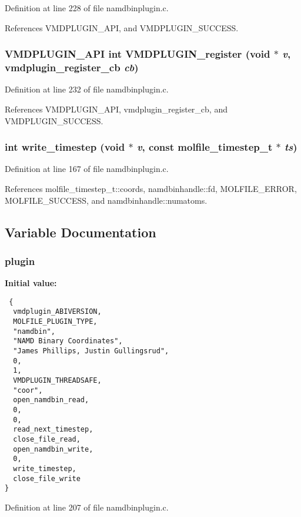Definition at line 228 of file namdbinplugin.c.

References VMDPLUGIN\_\-API, and VMDPLUGIN\_\-SUCCESS.
\subsubsection{\setlength{\rightskip}{0pt plus 5cm}VMDPLUGIN\_\-API int VMDPLUGIN\_\-register (void $\ast$ {\em v}, {\bf vmdplugin\_\-register\_\-cb} {\em cb})}\label{namdbinplugin_8c_a8}




Definition at line 232 of file namdbinplugin.c.

References VMDPLUGIN\_\-API, vmdplugin\_\-register\_\-cb, and VMDPLUGIN\_\-SUCCESS.
\subsubsection{\setlength{\rightskip}{0pt plus 5cm}int write\_\-timestep (void $\ast$ {\em v}, const {\bf molfile\_\-timestep\_\-t} $\ast$ {\em ts})\hspace{0.3cm}{\tt  [static]}}\label{namdbinplugin_8c_a5}




Definition at line 167 of file namdbinplugin.c.

References molfile\_\-timestep\_\-t::coords, namdbinhandle::fd, MOLFILE\_\-ERROR, MOLFILE\_\-SUCCESS, and namdbinhandle::numatoms.

\subsection{Variable Documentation}
\subsubsection{ plugin\hspace{0.3cm}{\tt  [static]}}\label{namdbinplugin_8c_a0}


{\bf Initial value:}

\footnotesize\begin{verbatim} {
  vmdplugin_ABIVERSION,         
  MOLFILE_PLUGIN_TYPE,          
  "namdbin",                    
  "NAMD Binary Coordinates",    
  "James Phillips, Justin Gullingsrud",  
  0,                            
  1,                            
  VMDPLUGIN_THREADSAFE,         
  "coor",                       
  open_namdbin_read,
  0,
  0,
  read_next_timestep,
  close_file_read,
  open_namdbin_write,
  0,
  write_timestep,
  close_file_write
}\end{verbatim}\normalsize 


Definition at line 207 of file namdbinplugin.c.